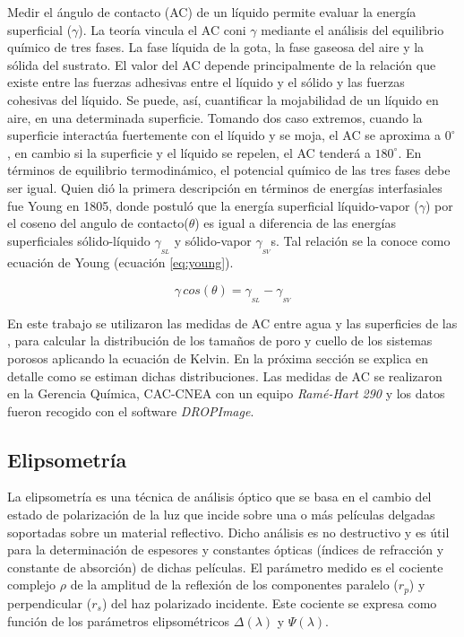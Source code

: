 		Medir el ángulo de contacto (AC) de un líquido permite evaluar la energía superficial ($\gamma$). La teoría vincula el AC coni $\gamma$ mediante el análisis del equilibrio químico de tres fases. La fase líquida de la gota, la fase gaseosa del aire y la sólida del sustrato. El valor del AC depende principalmente de la relación que existe entre las fuerzas adhesivas entre el líquido y el sólido y las fuerzas cohesivas del líquido. Se puede, así, cuantificar la mojabilidad de un líquido en aire, en una determinada superficie.\cite{findenegg1997} Tomando dos caso extremos, cuando la superficie interactúa fuertemente con el líquido y se moja, el AC se aproxima a $0^{\circ}$, en cambio si la superficie y el líquido se repelen, el AC tenderá a $180^{\circ}$. En términos de equilibrio termodinámico, el potencial químico de las tres fases  debe ser igual. Quien dió la primera descripción en términos de energías interfasiales fue Young en 1805\cite{young1805}, donde postuló que la energía superficial líquido-vapor ($\gamma$) por el coseno del angulo de contacto($\theta$) es igual a diferencia de las energías superficiales sólido-líquido $\gamma_{_{SL}}$ y sólido-vapor $\gamma_{_{SV}}$s. Tal relación se la conoce como ecuación de Young (ecuación \ref{eq:young}).

			\begin{equation}
				\gamma\, cos(\theta) = \gamma_{_{SL}} - \gamma_{_{SV}}
				\label{eq:young} 
				\end{equation}

		En este trabajo se utilizaron las medidas de AC entre agua y las superficies de las \pdm, para calcular la distribución de los tamaños de poro y cuello de los sistemas porosos aplicando la ecuación de Kelvin.\cite{Boissiere2005} En la próxima sección se explica en detalle como se estiman dichas distribuciones.
		Las medidas de AC se realizaron en la Gerencia Química, CAC-CNEA con un equipo \textit{Ramé-Hart 290} y los datos fueron recogido con el software \textit{DROPImage}.

	\subsection{Elipsometría}\label{sec:elipso}

		La elipsometría es una técnica de análisis óptico que se basa en el cambio del estado de polarización de la luz que incide sobre una o más películas delgadas soportadas sobre un material reflectivo. Dicho análisis es no destructivo y es útil para la determinación de espesores y constantes ópticas (índices de refracción y constante de absorción) de dichas películas.\cite{TompkinsHarlandG.1999,Rothen1945} El parámetro medido es el cociente complejo $\rho$ de la amplitud de la reflexión de los componentes paralelo ($r_p$) y perpendicular ($r_s$) del haz polarizado incidente. Este cociente se expresa como función de los parámetros elipsométricos $\Delta(\lambda)$ y $\Psi(\lambda)$. 

